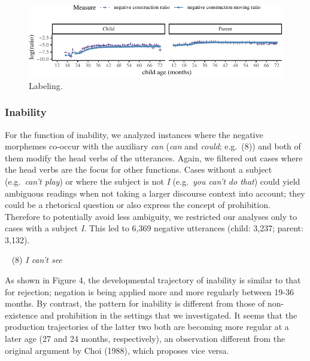 \documentclass[10pt, letterpaper]{article}
\newenvironment{CodeChunk}{}{}
\begin{document}
\begin{figure}[h!]

\begin{CodeChunk}


\begin{center}\includegraphics{figs/learning-1} \end{center}

\end{CodeChunk}
\caption[This image spans both columns]{Labeling.}\label{fig:labeling}
\end{figure}

\hypertarget{inability}{%
\subsubsection{Inability}\label{inability}}

For the function of inability, we analyzed instances where the negative
morphemes co-occur with the auxiliary \emph{can} (\emph{can} and
\emph{could}; e.g.~(8)) and both of them modify the head verbs of the
utterances. Again, we filtered out cases where the head verbs are the
focus for other functions. Cases without a subject (e.g.~\emph{can't
play}) or where the subject is not \emph{I} (e.g.~\emph{you can't do
that}) could yield ambiguous readings when not taking a larger discourse
context into account; they could be a rhetorical question or also
express the concept of prohibition. Therefore to potentially avoid less
ambiguity, we restricted our analyses only to cases with a subject
\emph{I}. This led to 6,369 negative utterances (child: 3,237; parent:
3,132).

~ (8) \emph{I can't see}

As shown in Figure 4, the developmental trajectory of inability is
similar to that for rejection; negation is being applied more and more
regularly between 19-36 months. By contrast, the pattern for inability
is different from those of non-existence and prohibition in the settings
that we investigated. It seems that the production trajectories of the
latter two both are becoming more regular at a later age (27 and 24
months, respectively), an observation different from the original
argument by Choi (1988), which proposes vice versa.
\end{document}
